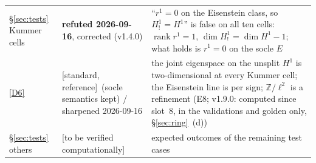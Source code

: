 \documentclass[11pt]{article}
\theoremstyle{remark}
\newcommand{\Z}{\mathbb{Z}}
\DeclareMathOperator{\rank}{rank}
\newcommand{\STD}{\textsf{[standard, reference]}}
\newcommand{\VERIFY}{\textsf{[to be verified computationally]}}
\begin{document}
\begin{center}
\begin{longtable}{@{}l>{\raggedright\arraybackslash}p{3.6cm}>{\raggedright\arraybackslash}p{10.6cm}@{}}
\S\ref{sec:tests} Kummer cells & \textbf{refuted 2026-09-16}, corrected (v1.4.0) & ``$r^1=0$ on the Eisenstein class, so $H^1_!=H^1$'' is false on all ten cells: $\rank r^1=1$, $\dim H^1_!=\dim H^1-1$; what holds is $r^1=0$ on the socle $E$ \\
\ref{D6} & \STD\ (socle semantics kept) / sharpened 2026-09-16 & the joint eigenspace on the unsplit $H^1$ is two-dimensional at every Kummer cell; the Eisenstein line is per sign; $\Z/\ell^2$ is a refinement (E8; v1.9.0: computed since slot~8, in the validations and golden only, \S\ref{sec:ring}~(d)) \\
\S\ref{sec:tests} others & \VERIFY & expected outcomes of the remaining test cases \\
\bottomrule
\end{longtable}
\end{center}

\end{document}

